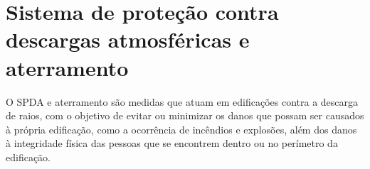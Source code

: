 \section{Sistema de proteção contra descargas atmosféricas e aterramento} \label{section: SPDA-ATT}

O SPDA e aterramento são medidas que atuam em edificações contra a descarga de raios, com o objetivo de evitar ou minimizar os danos que possam ser causados à própria edificação, como a ocorrência de incêndios e explosões, além dos danos à integridade física das pessoas que se encontrem dentro ou no perímetro da edificação.








\newpage
